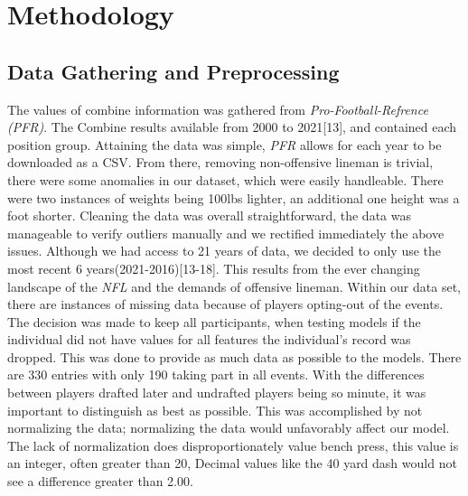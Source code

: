 \documentclass[confrence]{IEEEtran}
\begin{document}
\section*{Methodology}
\subsection*{Data Gathering and Preprocessing}
The values of combine information was gathered from \textit{Pro-Football-Refrence (PFR)}.
The Combine results available from 2000 to 2021[13], and contained each position group.
Attaining the data was simple, \textit{PFR} allows for each year to be downloaded as a CSV.
From there, removing non-offensive lineman is trivial, there were some anomalies in our dataset, 
which were easily handleable. There were two instances of weights being 100lbs lighter, an additional one height was a foot shorter.
Cleaning the data was overall straightforward, the data was manageable to verify outliers manually and we rectified immediately the above issues.
Although we had access to 21 years of data, we decided to only use the most recent 6 years(2021-2016)[13-18]. This results from the ever changing landscape of the \textit{NFL} and the demands of offensive lineman.
Within our data set, there are instances of missing data because of players opting-out of the events.
The decision was made to keep all participants, when testing models if the individual did not have values for all features the individual's record was dropped.
This was done to provide as much data as possible to the models. There are 330 entries with only 190 taking part in all events.
With the differences between players drafted later and undrafted players being so minute, it was important to distinguish as best as possible.
This was accomplished by not normalizing the data; normalizing the data would unfavorably affect our model.
The lack of normalization does disproportionately value bench press, this value is an integer, often greater than 20, Decimal values like the 40 yard dash would not see a difference greater than 2.00.
\end{document}
